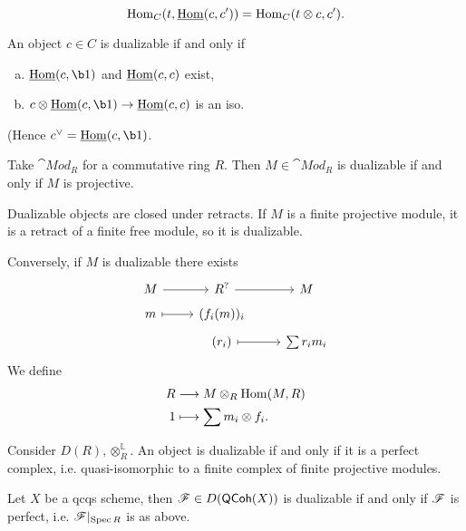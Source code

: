 \[
	\operatorname{Hom}_C(t,\underline{\operatorname{Hom}}(c,c')) = \operatorname{Hom}_C(t\otimes c,c')
.\]
\begin{corollary}
	An object $c\in C$ is dualizable if and only if
\begin{enumerate}[a)]
	\item $\iHom(c,\b1)$ and  $\underline{\operatorname{Hom}}(c,c)$ exist,
	\item $c\otimes \iHom(c,\b1)\to \iHom(c,c)$ is an iso.
\end{enumerate}
(Hence $c^{\vee} = \iHom(c,\b1)$.
\end{corollary}
\begin{example}
	Take $\cat{Mod}_R$ for a commutative ring $R$. Then $M\in \cat{Mod}_R$ is dualizable if
	and only if $M$ is projective.

	Dualizable objects are closed under retracts. If $M$ is a finite projective module, it
	is a retract of a finite free module, so it is dualizable.

	Conversely, if $M$ is dualizable there exists
	\[
		\begin{tikzcd}[row sep=tiny]
			M \ar[r] & R^{?} \ar[r] & M \\
			m \ar[r,mapsto] & (f_i(m))_i \\
			& (r_i) \ar[r, mapsto] & \sum r_im_i
		\end{tikzcd}
	\]
	We define
	\begin{align*}
		R &\longrightarrow M\otimes_R \operatorname{Hom}(M,R) \\
		1 &\longmapsto \sum m_i\otimes f_i
		.
	\end{align*}
\end{example}
\begin{example}
	Consider $D(R),\otimes_R^{\mathbb{L}}$. An object is dualizable if and only if it is a
	perfect complex, i.e. quasi-isomorphic to a finite complex of finite projective modules.
\end{example}
\begin{example}
	Let $X$ be a qcqs scheme, then $\mathscr{F}\in D(\mathsf{QCoh}(X))$ is dualizable if and only if
	$\mathscr{F}$ is perfect, i.e. $\mathscr{F}|_{\operatorname{Spec} R}$ is as above.
\end{example}
